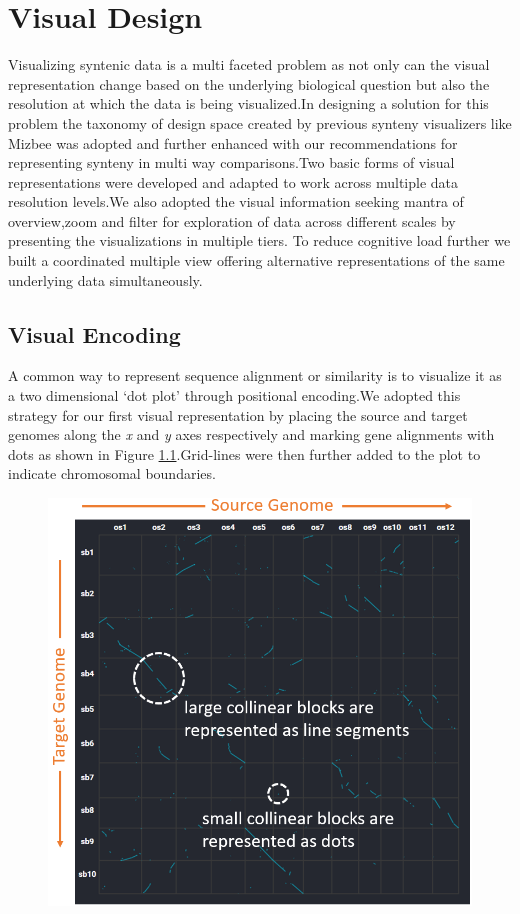 \chapter{Visual Design}

Visualizing syntenic data is a multi faceted problem as not only can the visual representation change based on the underlying biological question but also the resolution at which the data is being visualized.In designing a solution for this problem the taxonomy of design space created by previous synteny visualizers like Mizbee \cite{Meyer2009} was adopted and further enhanced with our recommendations for representing synteny in multi way comparisons.Two basic forms of visual representations were developed and adapted to work across multiple data resolution levels.We also adopted the visual information seeking mantra of overview,zoom and filter for exploration of data across different scales by presenting the visualizations in multiple tiers. To reduce cognitive load further we built a coordinated multiple view offering alternative representations of the same underlying data simultaneously.

\section{Visual Encoding}

A common way to represent sequence alignment or similarity is to visualize it as a two dimensional `dot plot' \cite{SONNHAMMER1995GC1,Cabanettes2018} through positional encoding.We adopted this strategy for our first visual representation by placing the source and target genomes along the \textit{x} and \textit{y} axes respectively and marking gene alignments with dots as shown in Figure \ref{fig:ch_4_dot_plot_a}.Grid-lines were then further added to the plot to indicate chromosomal boundaries.

\begin{figure}[h]
  \centering
  \includegraphics[width=.475\linewidth]{images/ch_4_dot_plot_a.PNG}
  \label{fig:ch_4_dot_plot_a}
\end{figure}

